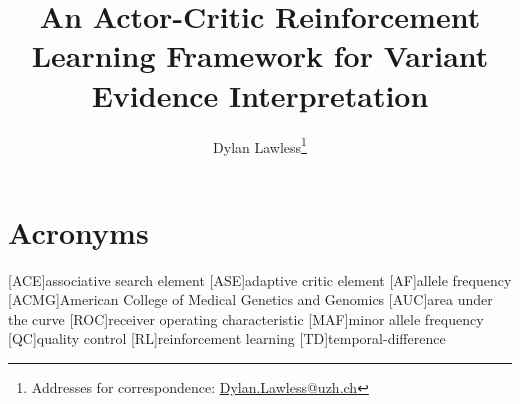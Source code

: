  
\usepackage[printonlyused,withpage,nohyperlinks]{acronym}

\newcommand{\boxlabel}[1]{%
  \refstepcounter{myboxcounter}%
  \label{#1}%
}

\title{An Actor-Critic Reinforcement Learning Framework for Variant Evidence Interpretation}

\author[1]{Dylan Lawless\thanks{Addresses for correspondence: \href{mailto:Dylan.Lawless@uzh.ch}{Dylan.Lawless@uzh.ch}}}

\maketitle
\justify

\section*{Acronyms}
\renewenvironment{description} %
{\list{}{\labelwidth0pt\itemindent-\leftmargin
    \parsep-1em\itemsep0pt\let\makelabel\descriptionlabel}}
               {\endlist}
\begin{acronym} 
[ACE]{associative search element}
[ASE]{adaptive critic element}
[AF]{allele frequency}
[ACMG]{American College of Medical Genetics and Genomics}
[AUC]{area under the curve}
[ROC]{receiver operating characteristic}
[MAF]{minor allele frequency}
[QC]{quality control}
[RL]{reinforcement learning}
[TD]{temporal-difference}
\end{acronym}


